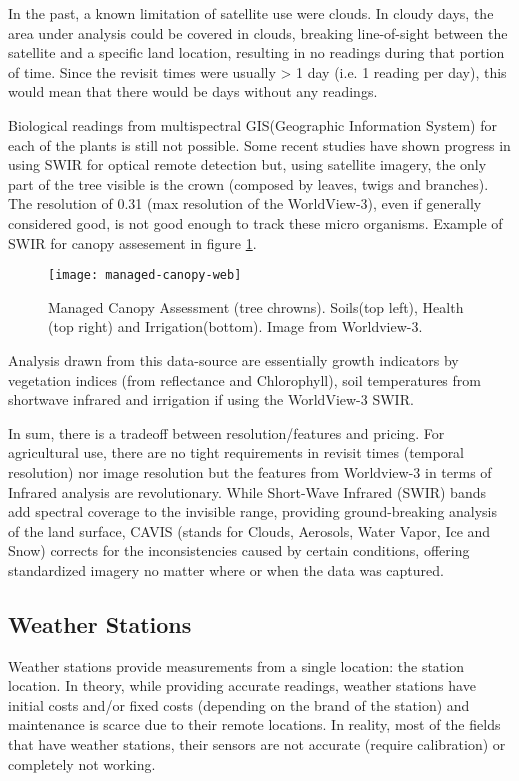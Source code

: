 In the past, a known limitation of satellite use were clouds. In cloudy days, the area under analysis could be covered in clouds, breaking line-of-sight between the satellite and a specific land location, resulting in no readings during that portion of time. Since the revisit times were usually > 1 day (i.e. 1 reading per day), this would mean that there would be days without any readings.

Biological readings from multispectral GIS(Geographic Information System) for each of the plants is still not possible. Some recent studies have shown progress in using SWIR for optical remote detection but, using satellite imagery, the only part of the tree visible is the crown (composed by leaves, twigs and branches). The resolution of 0.31 (max resolution of the WorldView-3), even if generally considered good, is not good enough to track these micro organisms. Example of SWIR for canopy assesement in figure \ref{fig:managed-canopy-web}.

\begin{figure}[htbp]
  \centering
  \texttt{[image: managed-canopy-web]}
  \caption{Managed Canopy Assessment (tree chrowns). Soils(top left), Health (top right) and Irrigation(bottom). Image from Worldview-3.}
  \label{fig:managed-canopy-web}
\end{figure}

Analysis drawn from this data-source are essentially growth indicators by vegetation indices (from reflectance and Chlorophyll), soil temperatures from shortwave infrared and irrigation if using the WorldView-3 SWIR.

In sum, there is a tradeoff between resolution/features and pricing. For agricultural use, there are no tight requirements in revisit times (temporal resolution) nor image resolution but the features from Worldview-3 in terms of Infrared analysis are revolutionary. While Short-Wave Infrared (SWIR) bands add spectral coverage to the invisible range, providing ground-breaking analysis of the land surface, CAVIS (stands for Clouds,  Aerosols, Water Vapor, Ice and Snow) corrects for the inconsistencies caused by certain conditions, offering standardized imagery no matter where or when the data was captured.

\subsection{Weather Stations}
\label{sec:weather_stations}

Weather stations provide measurements from a single location: the station location. In theory, while providing accurate readings, weather stations have initial costs and/or fixed costs (depending on the brand of the station) and maintenance is scarce due to their remote locations. In reality, most of the fields that have weather stations, their sensors are not accurate (require calibration) or completely not working.

